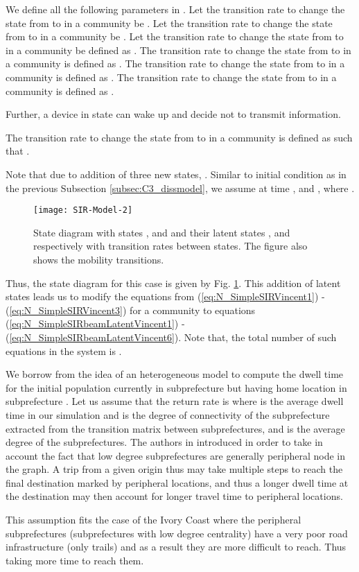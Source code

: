 \documentclass[review]{elsarticle}
\begin{document}
\begin{definition}\label{defdelta}
We define all the following parameters in . Let the transition rate to change the state from  to  in a community  be . Let the transition rate to change the state from  to  in a community  be . Let the transition rate to change the state from  to  in a community  be defined as . The transition rate to change the state from  to  in a community  is defined as . The transition rate to change the state from  to  in a community  is defined as . The transition rate to change the state from  to  in a community  is defined as .
\end{definition}

Further, a device in state  can wake up and decide not to transmit information.
\begin{definition}\label{defgamma}
The transition rate to change the state from  to  in a community  is defined as  such that .
\end{definition}

Note that due to addition of three new states, . Similar to initial condition as in the previous Subsection \ref{subsec:C3_dissmodel}, we assume at time  ,  and , where .
\begin{figure}
    \centering
    \texttt{[image: SIR-Model-2]}
    \caption{State diagram with states ,  and  and their latent states ,  and  respectively with transition rates between states. The figure also shows the mobility transitions.}
    \label{fig:spreadingmodel}
\end{figure}

Thus, the state diagram for this case is given by Fig. \ref{fig:spreadingmodel}. This addition of latent states leads us to modify the equations from (\ref{eq:N_SimpleSIRVincent1}) - (\ref{eq:N_SimpleSIRVincent3}) for a community  to equations (\ref{eq:N_SimpleSIRbeamLatentVincent1}) -  (\ref{eq:N_SimpleSIRbeamLatentVincent6}). Note that, the total number of such equations in the system is .

\begin{definition}\label{returnProba}
We borrow from \cite{polettoheterogeneous2012} the idea of an heterogeneous model to compute the dwell time for the initial population currently in subprefecture  but having home location in subprefecture . Let us assume that the return rate  is  where  is the average dwell time in our simulation and  is the degree of connectivity of the subprefecture  extracted from the transition matrix  between subprefectures, and  is the average degree of the subprefectures. The authors in \cite{polettoheterogeneous2012} introduced  in order to take in account the fact that low degree subprefectures are generally peripheral node in the graph. A trip from a given origin thus may take multiple steps to reach the final destination marked by peripheral locations, and thus a longer dwell time at the destination may then account for longer travel time to peripheral locations.
\end{definition}
This assumption fits the case of the Ivory Coast where the peripheral subprefectures (subprefectures with low degree centrality) have a very poor road infrastructure (only trails) and as a result they are more difficult to reach. Thus taking more time to reach them.
\end{document}
